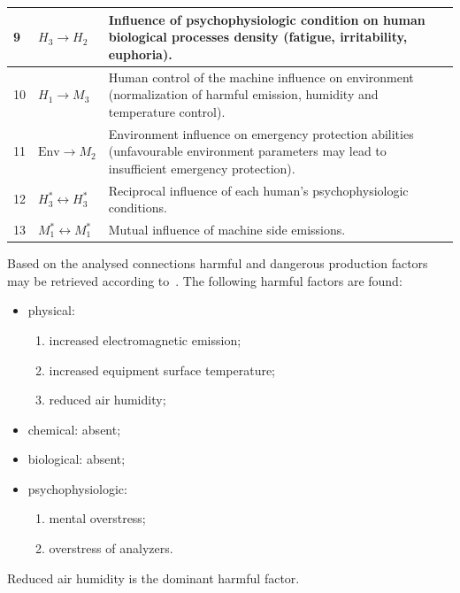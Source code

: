 \begin{longtable}{|p{}|p{}|p{}|}
    9 & $H_3 \rightarrow H_2$ & Influence of psychophysiologic condition on
    human biological processes density (fatigue, irritability, euphoria). \\ \hline
    10 & $H_1 \rightarrow M_3$ &
    Human control of the machine influence on environment (normalization of
    harmful emission, humidity and temperature control). \\ \hline
    11 & $\text{Env} \rightarrow M_2$ & Environment influence on emergency
    protection abilities (unfavourable environment parameters may lead to
    insufficient emergency protection). \\ \hline
    12 & $H^*_3 \leftrightarrow H^*_3$ & Reciprocal influence of each human's
    psychophysiologic conditions. \\ \hline
    13 & $M^*_1 \leftrightarrow M^*_1$ & Mutual influence of machine side
    emissions. \\ \hline
\end{longtable}

Based on the analysed connections harmful and dangerous production factors may
be retrieved according to~\cite{gost003}. The following harmful factors are
found:
\begin{itemize}
    \item physical:
        \begin{enumerate}
            \item increased electromagnetic emission;
            \item increased equipment surface temperature;
            \item reduced air humidity;
        \end{enumerate}
    \item chemical: absent;
    \item biological: absent;
    \item psychophysiologic:
        \begin{enumerate}
            \item mental overstress;
            \item overstress of analyzers.
        \end{enumerate}
\end{itemize}
Reduced air humidity is the dominant harmful factor.


